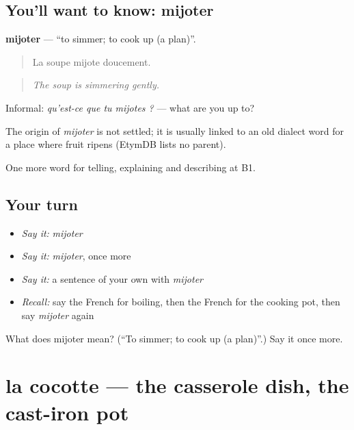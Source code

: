 \subsection*{You'll want to know: mijoter}
\textbf{mijoter} — \textquotedblleft{}to simmer; to cook up (a plan)\textquotedblright{}.

\begin{quote}
La soupe mijote doucement.
\end{quote}

\begin{quote}
\emph{The soup is simmering gently.}
\end{quote}

Informal: \emph{qu'est-ce que tu mijotes ?} — what are you up to?

\begin{cousinweb}
The origin of \emph{mijoter} is not settled; it is usually linked to an old dialect word for a place where fruit ripens (EtymDB lists no parent).
\end{cousinweb}

\begin{grammarlens}[title={What you've built}]
One more word for telling, explaining and describing at B1.
\end{grammarlens}

\subsection*{Your turn}
\begin{itemize}
\raggedright
  \item \emph{Say it:} \emph{mijoter}
  \item \emph{Say it:} \emph{mijoter}, once more
  \item \emph{Say it:} a sentence of your own with \emph{mijoter}
  \item \emph{Recall:} say the French for boiling, then the French for the cooking pot, then say \emph{mijoter} again
\end{itemize}

\begin{tcolorbox}[breakable,colback=teal!4,colframe=teal!35!black,title={Before you move on}]
What does mijoter mean? (\textquotedblleft{}To simmer; to cook up (a plan)\textquotedblright{}.) Say it once more.
\end{tcolorbox}
\section[la cocotte]{la cocotte — the casserole dish, the cast-iron pot}

